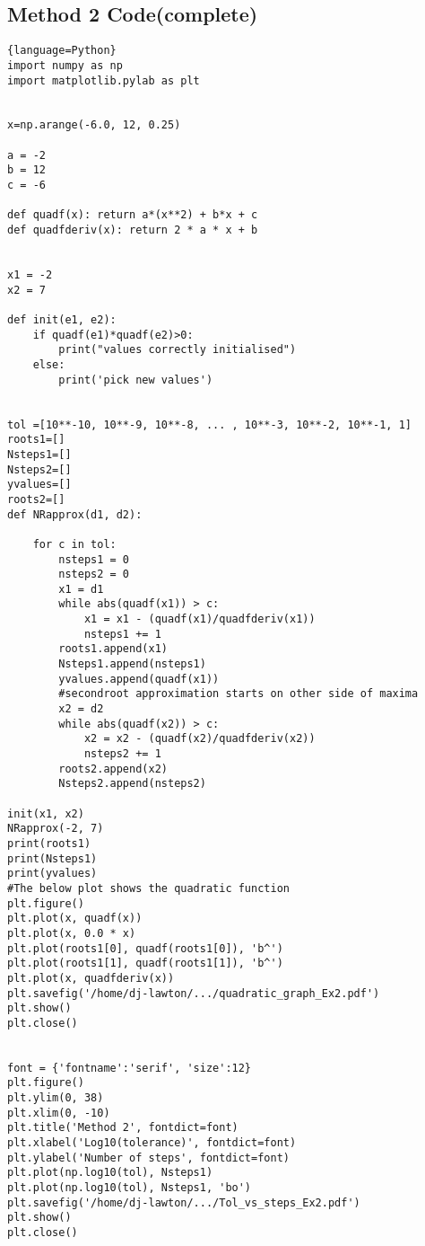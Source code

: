\documentclass{article}
\begin{document}
\subsection{Method 2 Code(complete)}
\begin{lstlisting}{language=Python}
import numpy as np
import matplotlib.pylab as plt


x=np.arange(-6.0, 12, 0.25)

a = -2
b = 12
c = -6

def quadf(x): return a*(x**2) + b*x + c
def quadfderiv(x): return 2 * a * x + b


x1 = -2
x2 = 7

def init(e1, e2):
    if quadf(e1)*quadf(e2)>0:
        print("values correctly initialised")
    else:
        print('pick new values')
        

tol =[10**-10, 10**-9, 10**-8, ... , 10**-3, 10**-2, 10**-1, 1]
roots1=[]
Nsteps1=[]
Nsteps2=[]
yvalues=[]
roots2=[]
def NRapprox(d1, d2):
    
    for c in tol:
        nsteps1 = 0
        nsteps2 = 0
        x1 = d1
        while abs(quadf(x1)) > c:
            x1 = x1 - (quadf(x1)/quadfderiv(x1))
            nsteps1 += 1
        roots1.append(x1)
        Nsteps1.append(nsteps1)
        yvalues.append(quadf(x1))
        #secondroot approximation starts on other side of maxima
        x2 = d2
        while abs(quadf(x2)) > c:
            x2 = x2 - (quadf(x2)/quadfderiv(x2))
            nsteps2 += 1
        roots2.append(x2)
        Nsteps2.append(nsteps2)

init(x1, x2)
NRapprox(-2, 7)
print(roots1)
print(Nsteps1)
print(yvalues)
#The below plot shows the quadratic function
plt.figure()
plt.plot(x, quadf(x))
plt.plot(x, 0.0 * x)
plt.plot(roots1[0], quadf(roots1[0]), 'b^')
plt.plot(roots1[1], quadf(roots1[1]), 'b^')
plt.plot(x, quadfderiv(x))
plt.savefig('/home/dj-lawton/.../quadratic_graph_Ex2.pdf')
plt.show()
plt.close()


font = {'fontname':'serif', 'size':12}
plt.figure()
plt.ylim(0, 38)
plt.xlim(0, -10)
plt.title('Method 2', fontdict=font)
plt.xlabel('Log10(tolerance)', fontdict=font)
plt.ylabel('Number of steps', fontdict=font)
plt.plot(np.log10(tol), Nsteps1)
plt.plot(np.log10(tol), Nsteps1, 'bo')
plt.savefig('/home/dj-lawton/.../Tol_vs_steps_Ex2.pdf')
plt.show()
plt.close()
\end{lstlisting}
\end{document}
